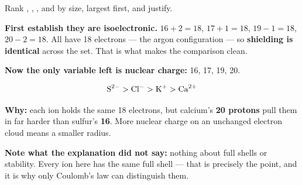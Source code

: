 \documentclass{apchem-worksheet}
\begin{document}
\begin{center}
\end{center}

\begin{workedexample}
Rank , , , and  by size, largest
first, and justify.

\textbf{First establish they are isoelectronic.} $16+2 = 18$,
$17+1 = 18$, $19-1 = 18$, $20-2 = 18$. All have 18 electrons --- the
argon configuration --- so \textbf{shielding is identical} across the
set. That is what makes the comparison clean.

\textbf{Now the only variable left is nuclear charge:} 16, 17, 19, 20.

\[ \ce{S^2-} > \ce{Cl-} > \ce{K+} > \ce{Ca^2+} \]

\textbf{Why:} each ion holds the same 18 electrons, but calcium's
\textbf{20 protons} pull them in far harder than sulfur's \textbf{16}.
More nuclear charge on an unchanged electron cloud means a smaller
radius.

\textbf{Note what the explanation did not say:} nothing about full
shells or stability. Every ion here has the same full shell --- that is
precisely the point, and it is why only Coulomb's law can distinguish
them.
\end{workedexample}
\end{document}
